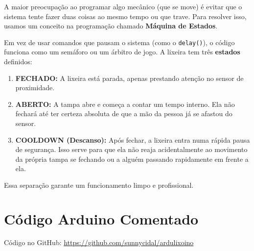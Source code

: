 \documentclass[12pt, openany, oneside, a4paper, brazilian]{abntex2}
\begin{document}
A maior preocupação ao programar algo mecânico (que se move) é evitar que o sistema tente fazer duas coisas ao mesmo tempo ou que trave. Para resolver isso, usamos um conceito na programação chamado \textbf{Máquina de Estados}. 

Em vez de usar comandos que pausam o sistema (como o \texttt{delay()}), o código funciona como um semáforo ou um árbitro de jogo. A lixeira tem três \textbf{estados} definidos:

\begin{enumerate}
    \item \textbf{FECHADO:} A lixeira está parada, apenas prestando atenção no sensor de proximidade.
    \item \textbf{ABERTO:} A tampa abre e começa a contar um tempo interno. Ela não fechará até ter certeza absoluta de que a mão da pessoa já se afastou do sensor.
    \item \textbf{COOLDOWN (Descanso):} Após fechar, a lixeira entra numa rápida pausa de segurança. Isso serve para que ela não reaja acidentalmente ao movimento da própria tampa se fechando ou a alguém passando rapidamente em frente a ela.
\end{enumerate}

Essa separação garante um funcionamento limpo e profissional.

\section{Código Arduino Comentado}

Código no GitHub: \url{https://github.com/sunnycidal/ardulixoino}
\end{document}
